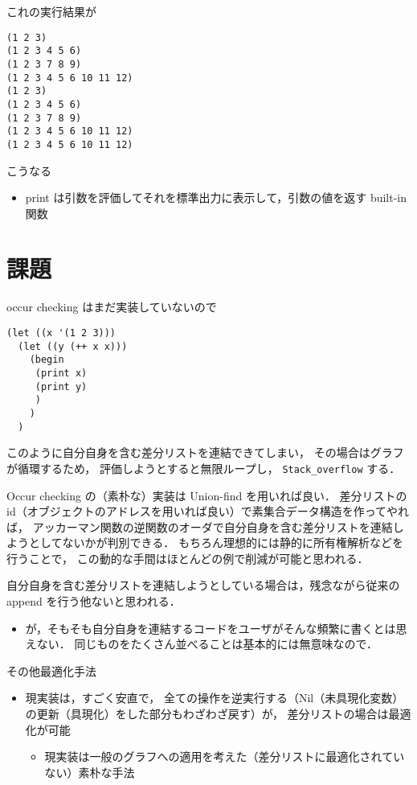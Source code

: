 \documentclass[10pt, a4j, twocolumn]{scrartcl}
\begin{document}
これの実行結果が

\begin{verbatim}
(1 2 3)
(1 2 3 4 5 6)
(1 2 3 7 8 9)
(1 2 3 4 5 6 10 11 12)
(1 2 3)
(1 2 3 4 5 6)
(1 2 3 7 8 9)
(1 2 3 4 5 6 10 11 12)
(1 2 3 4 5 6 10 11 12)
\end{verbatim}

こうなる
\begin{itemize}
\item print は引数を評価してそれを標準出力に表示して，引数の値を返す built-in 関数
\end{itemize}


\section{課題}
\label{sec:org5acfc39}

occur checking はまだ実装していないので

\begin{lstlisting}
(let ((x '(1 2 3)))
  (let ((y (++ x x)))
    (begin
     (print x)
     (print y)
     )
    )
  )
\end{lstlisting}

このように自分自身を含む差分リストを連結できてしまい，
その場合はグラフが循環するため，
評価しようとすると無限ループし， \texttt{Stack\_overflow} する．

Occur checking の（素朴な）実装は Union-find を用いれば良い．
差分リストの id（オブジェクトのアドレスを用いれば良い）で素集合データ構造を作ってやれば，
アッカーマン関数の逆関数のオーダで自分自身を含む差分リストを連結しようとしてないかが判別できる．
もちろん理想的には静的に所有権解析などを行うことで，
この動的な手間はほとんどの例で削減が可能と思われる．

自分自身を含む差分リストを連結しようとしている場合は，残念ながら従来の append を行う他ないと思われる．
\begin{itemize}
\item が，そもそも自分自身を連結するコードをユーザがそんな頻繁に書くとは思えない．
同じものをたくさん並べることは基本的には無意味なので．
\end{itemize}


その他最適化手法
\begin{itemize}
\item 現実装は，すごく安直で，
全ての操作を逆実行する（Nil（未具現化変数）の更新（具現化）をした部分もわざわざ戻す）が，
差分リストの場合は最適化が可能
\begin{itemize}
\item 現実装は一般のグラフへの適用を考えた（差分リストに最適化されていない）素朴な手法
\end{itemize}
\end{itemize}
\end{document}
